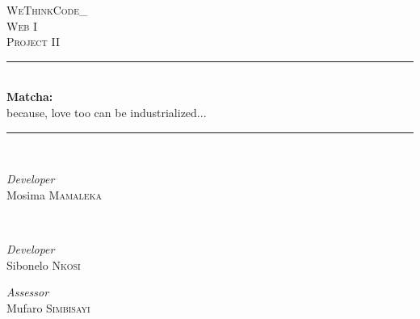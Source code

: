 \begin{titlepage} %
	\newcommand{\HRule}{\rule{\linewidth}{0.5mm}} %
	
	\center %
	
	
	\textsc{\LARGE WeThinkCode\_}\\[1.5cm] %
	
	\textsc{\Large Web I}\\[0.5cm] %
	
	\textsc{\large Project II}\\[0.5cm] %
	
	
	\HRule\\[0.4cm]
	
	{\huge\bfseries Matcha: }\\{\large because, love too can be industrialized...}\\[0.4cm] %
	
	\HRule\\[1.5cm]
	
	
	\begin{minipage}{0.4\textwidth}
		\begin{flushleft}
			\large
			\textit{Developer}\\
			Mosima \textsc{Mamaleka} %
		\end{flushleft}
	\end{minipage}
	~
	\begin{minipage}{0.4\textwidth}
		\begin{flushright}
			\large
			\textit{Developer}\\
			Sibonelo \textsc{Nkosi} %
		\end{flushright}
	\end{minipage}
	\vfill
	{\large\textit{Assessor}}\\
	Mufaro \textsc{Simbisayi}\\ %


\end{titlepage}
